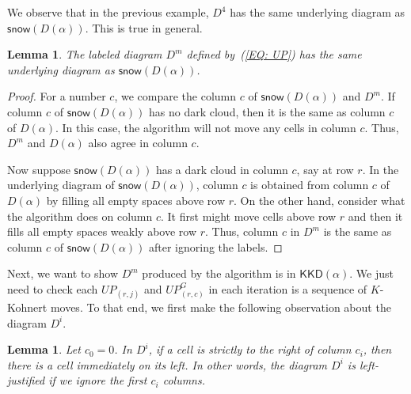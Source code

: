 \documentclass[10pt]{amsart}
\theoremstyle{plain}
\theoremstyle{plain}
\theoremstyle{definition}
\theoremstyle{definition}
\theoremstyle{definition}
\theoremstyle{plain}
\newtheorem{lem}[lem]{Lemma}
\theoremstyle{plain}
\theoremstyle{plain}
\newtheorem{lemma}[lemma]{Lemma}
\theoremstyle{plain}
\theoremstyle{plain}
\theoremstyle{remark}
\theoremstyle{remark}
\theoremstyle{plain}
\theoremstyle{plain}
\newcommand{\KKD}{\mathsf{KKD}}
\newcommand{\snow}{\mathsf{snow}}
\begin{document}
We observe that in the previous example, 
$D^4$ has the same underlying diagram as $\snow(D(\alpha))$.
This is true in general.

\begin{lem}
The labeled diagram $D^m$ defined by~(\ref{EQ: UP})
has the same underlying diagram as $\snow(D(\alpha))$.
\end{lem}
\begin{proof}
For a number $c$, 
we compare the column $c$ 
of $\snow(D(\alpha))$ and $D^m$.
If column $c$ of $\snow(D(\alpha))$ has no dark cloud,
then it is the same as column $c$ of $D(\alpha)$.
In this case, the algorithm will not move any cells 
in column $c$.
Thus, $D^m$ and $D(\alpha)$ also agree in column $c$.

Now suppose $\snow(D(\alpha))$ has a dark cloud
in column $c$, say at row $r$.
In the underlying diagram of $\snow(D(\alpha))$,
column $c$ is obtained from column $c$ of $D(\alpha)$ 
by filling all empty spaces above row $r$.  
On the other hand, consider what the algorithm does on column $c$.
It first might move cells above row $r$
and then it fills all empty spaces weakly above row $r$.
Thus, column $c$ in $D^m$ is the same as 
column $c$ of $\snow(D(\alpha))$ after ignoring the labels.  
\end{proof}

Next, we want to show $D^m$ produced by the algorithm
is in $\KKD(\alpha)$.
We just need to check each $UP_{(r,j)}$ and $UP^G_{(r,c)}$ in each iteration is a sequence of $K$-Kohnert moves. To that end, we first make the following observation about the diagram $D^i$.

\begin{lemma}
Let $c_0 = 0$. In $D^i$,
if a cell is strictly to the right of column $c_i$,
then there is a cell immediately on its left.
In other words, 
the diagram $D^i$ is left-justified if we ignore the first $c_i$ columns.
\end{lemma}
\end{document}
